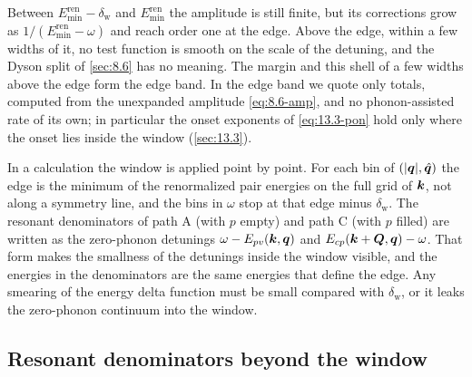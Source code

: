 Between $E^{\mathrm{ren}}_{\mathrm{min}} - \delta_{\mathrm{w}}$ and $E^{\mathrm{ren}}_{\mathrm{min}}$ the amplitude is still finite, but its corrections grow as $1/(E^{\mathrm{ren}}_{\mathrm{min}} - \omega)$ and reach order one at the edge. Above the edge, within a few widths of it, no test function is smooth on the scale of the detuning, and the Dyson split of \cref{sec:8.6} has no meaning. The margin and this shell of a few widths above the edge form the edge band. In the edge band we quote only totals, computed from the unexpanded amplitude \cref{eq:8.6-amp}, and no phonon-assisted rate of its own; in particular the onset exponents of \cref{eq:13.3-pon} hold only where the onset lies inside the window (\cref{sec:13.3}).

In a calculation the window is applied point by point. For each bin of $(|\bm{q}|,\hat{\bm{q}})$ the edge is the minimum of the renormalized pair energies on the full grid of $\bm{k}$, not along a symmetry line, and the bins in $\omega$ stop at that edge minus $\delta_{\mathrm{w}}$. The resonant denominators of path A (with $p$ empty) and path C (with $p$ filled) are written as the zero-phonon detunings $\omega - E_{pv}(\bm{k},\bm{q})$ and $E_{cp}(\bm{k}+\bm{Q},\bm{q}) - \omega$. That form makes the smallness of the detunings inside the window visible, and the energies in the denominators are the same energies that define the edge. Any smearing of the energy delta function must be small compared with $\delta_{\mathrm{w}}$, or it leaks the zero-phonon continuum into the window.

\subsection{Resonant denominators beyond the window}

